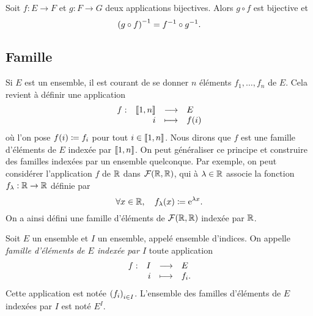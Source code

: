 \documentclass{magnolia}
\begin{document}

\begin{proposition}[utile=-3]
Soit $f:E\to F$ et $g:F\to G$ deux applications bijectives. Alors $g\circ f$
est bijective et
\[\left(g\circ f\right)^{-1}=f^{-1} \circ g^{-1}.\]
\end{proposition}

\subsection{Famille}

Si $E$ est un ensemble, il est courant de se donner $n$ éléments
$f_1,\ldots,f_n$ de $E$. Cela revient à définir une application
\[\begin{array}[t]{lrcl} \displaystyle{f} : & \displaystyle{\left\llbracket 1,n\right\rrbracket} & \longrightarrow & \displaystyle{E} \\ & \displaystyle{i} & \longmapsto & \displaystyle{f(i)} \end{array}\]
où l'on pose $f(i)\coloneqq f_i$ pour tout $i\in\left\llbracket 1,n\right\rrbracket$. Nous dirons que $f$ est une
famille d'éléments de $E$ indexée par $\left\llbracket 1,n\right\rrbracket$. On peut généraliser ce principe
et construire des familles indexées par un ensemble quelconque. Par exemple, on peut considérer
l'application $f$ de $\mathbb{R}$ dans $\mathcal{F}(\mathbb{R}, \mathbb{R})$, qui à $\lambda\in\mathbb{R}$ associe la
fonction $f_\lambda:\mathbb{R}\to\mathbb{R}$ définie par
\[\forall x\in\mathbb{R},\quad f_\lambda(x)\coloneqq{\rm e}^{\lambda x}.\]
On a ainsi défini une famille d'éléments de $\mathcal{F}(\mathbb{R}, \mathbb{R})$ indexée par $\mathbb{R}$.

\begin{definition}[utile=-3]
Soit $E$ un ensemble et $I$ un ensemble, appelé ensemble d'indices. On appelle
\emph{famille d'éléments de $E$ indexée par $I$} toute application
\[\begin{array}[t]{lrcl} \displaystyle{f} : & \displaystyle{I} & \longrightarrow & \displaystyle{E} \\ & \displaystyle{i} & \longmapsto & \displaystyle{f_i.} \end{array}\]
Cette application est notée $\left(f_i\right)_{i\in I}$. L'ensemble des familles
d'éléments de $E$ indexées par $I$ est noté $E^I$.
\end{definition}
\end{document}
